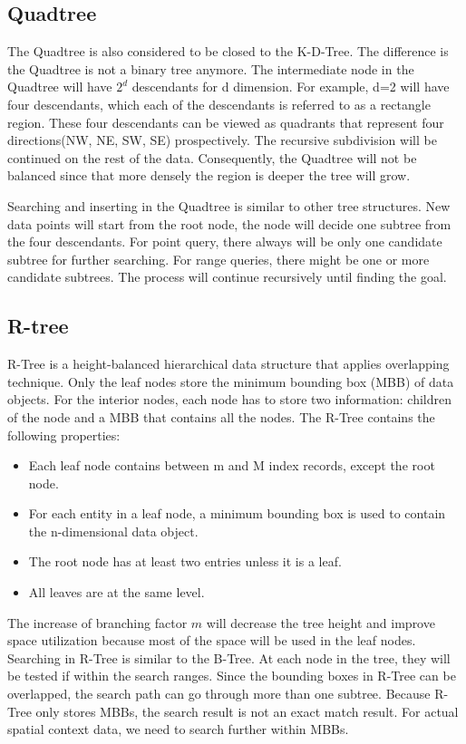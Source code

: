 \subsection{Quadtree}
The Quadtree \cite{CSUR:tm} is also considered to be closed to the K-D-Tree. The difference is the Quadtree is not a binary tree anymore. The intermediate node in the Quadtree will have ${2^d}$ descendants for d dimension. For example, d=2 will have four descendants, which each of the descendants is referred to as a rectangle region. These four descendants can be viewed as quadrants that represent four directions(NW, NE, SW, SE) prospectively. The recursive subdivision will be continued on the rest of the data. Consequently, the Quadtree will not be balanced since that more densely the region is deeper the tree will grow. 

Searching and inserting in the Quadtree is similar to other tree structures. New data points will start from the root node, the node will decide one subtree from the four descendants. For point query, there always will be only one candidate subtree for further searching. For range queries, there might be one or more candidate subtrees. The process will continue recursively until finding the goal.


\subsection{R-tree}
R-Tree\cite{Guttman:1984ka} is a height-balanced hierarchical data structure that applies overlapping technique. Only the leaf nodes store the minimum bounding box (MBB) of data objects. For the interior nodes, each node has to store two information: children of the node and a MBB that contains all the nodes. The R-Tree contains the following properties: 

\begin{itemize}
  \item Each leaf node contains between m and M index records, except the root node. 
  \item For each entity in a leaf node, a minimum bounding box is used to contain the n-dimensional data object.
  \item The root node has at least two entries unless it is a leaf.
  \item All leaves are at the same level.
\end{itemize}


The increase of branching factor ${m}$ will decrease the tree height and improve space utilization because most of the space will be used in the leaf nodes. Searching in R-Tree is similar to the B-Tree. At each node in the tree, they will be tested if within the search ranges. Since the bounding boxes in R-Tree can be overlapped, the search path can go through more than one subtree. Because R-Tree only stores MBBs, the search result is not an exact match result. For actual spatial context data, we need to search further within MBBs.


